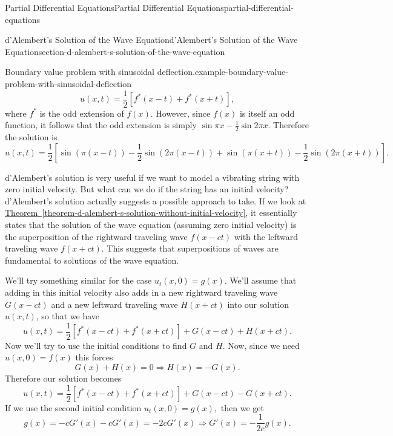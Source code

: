 \documentclass[oneside,10pt,]{book}
\numberwithin{equation}{section}
\begin{document}
\begin{chapterptx}{Partial Differential Equations}{}{Partial Differential Equations}{}{}{partial-differential-equations}
\begin{sectionptx}{d'Alembert's Solution of the Wave Equation}{}{d'Alembert's Solution of the Wave Equation}{}{}{section-d-alembert-s-solution-of-the-wave-equation}
\begin{example}{Boundary value problem with sinusoidal deflection.}{example-boundary-value-problem-with-sinusoidal-deflection}
\begin{equation*}
u(x,t) = \frac{1}{2}[f^{*}(x-t)+f^{*}(x+t)],
\end{equation*}
where \(f^{*}\) is the odd extension of \(f(x)\). However, since \(f(x)\) is itself an odd function, it follows that the odd extension is simply \(\sin\pi x-\frac{1}{2}\sin2\pi x\). Therefore the solution is%
%
\begin{equation*}
u(x,t) = \frac{1}{2}\left[\sin(\pi(x-t))-\frac{1}{2}\sin(2\pi(x-t)) + \sin(\pi(x+t)) - \frac{1}{2}\sin(2\pi(x+t))\right].
\end{equation*}
\end{example}
\hypertarget{p-678}{}%
d'Alembert's solution is very useful if we want to model a vibrating string with zero initial velocity. But what can we do if the string has an initial velocity? d'Alembert's solution actually suggests a possible approach to take. If we look at \hyperref[theorem-d-alembert-s-solution-without-initial-velocity]{Theorem~\ref{theorem-d-alembert-s-solution-without-initial-velocity}}, it essentially states that the solution of the wave equation (assuming zero initial velocity) is the superposition of the rightward traveling wave \(f(x-ct)\) with the leftward traveling wave \(f(x+ct)\). This suggests that superpositions of waves are fundamental to solutions of the wave equation.%
\par
\hypertarget{p-679}{}%
We'll try something similar for the case \(u_{t}(x,0) = g(x)\). We'll assume that adding in this initial velocity also adds in a new rightward traveling wave \(G(x-ct)\) and a new leftward traveling wave \(H(x+ct)\) into our solution \(u(x,t)\), so that we have%
%
\begin{equation*}
u(x,t) = \frac{1}{2}[f^{*}(x-ct)+f^{*}(x+ct)] + G(x-ct) + H(x+ct).
\end{equation*}
\hypertarget{p-680}{}%
Now we'll try to use the initial conditions to find \(G\) and \(H\). Now, since we need \(u(x,0) = f(x)\) this forces%
%
\begin{equation*}
G(x) + H(x) = 0\Rightarrow H(x) = -G(x).
\end{equation*}
\hypertarget{p-681}{}%
Therefore our solution becomes%
\begin{equation*}
u(x,t) = \frac{1}{2}[f^{*}(x-ct)+f^{*}(x+ct)] + G(x-ct) - G(x+ct).
\end{equation*}
If we use the second initial condition \(u_{t}(x,0) = g(x),\) then we get%
\begin{equation*}
g(x) = -cG'(x) - cG'(x) = -2cG'(x) \Rightarrow G'(x) = -\frac{1}{2c}g(x).

\end{equation*}
\end{sectionptx}
\end{chapterptx}
\end{document}

